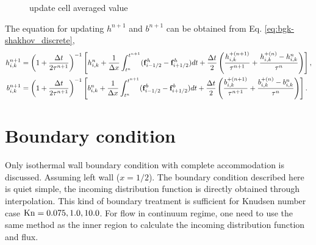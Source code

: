 \documentclass[a4paper]{book}
\begin{document}
\begin{figure}[htb!]
    \centering
    \caption{update cell averaged value}
    \label{pic:update}
\end{figure}

The equation for updating $h^{n+1}$ and $b^{n+1}$ can be obtained from Eq. \ref{eq:bgk-shakhov_discrete},
$$
\begin{aligned}
    h_{i,k}^{n+1} &= \left(1+\frac{\Delta t}{2\tau^{n+1}}\right)^{-1}\left[h_{i,k}^n+\frac{1}{\Delta x}\int_{t^n}^{t^{n+1}}({\bf f}_{i-1/2}^h-{\bf f}_{i+1/2}^h)dt+\frac{\Delta t}{2}\left(\frac{h_{i,k}^{+(n+1)}}{\tau^{n+1}}+\frac{h_{i,k}^{+(n)}-h_{i,k}^n}{\tau^n}\right)\right],\\
    b_{i,k}^{n+1} &= \left(1+\frac{\Delta t}{2\tau^{n+1}}\right)^{-1}\left[b_{i,k}^n+\frac{1}{\Delta x}\int_{t^n}^{t^{n+1}}({\bf f}_{i-1/2}^b-{\bf f}_{i+1/2}^b)dt+\frac{\Delta t}{2}\left(\frac{b_{i,k}^{+(n+1)}}{\tau^{n+1}}+\frac{b_{i,k}^{+(n)}-b_{i,k}^n}{\tau^n}\right)\right].\\
\end{aligned} 
$$

\section{Boundary condition}
Only isothermal wall boundary condition with complete accommodation is discussed. Assuming left wall ($x=1/2$). The boundary condition described here is quiet simple, the incoming distribution function is directly obtained through interpolation. This kind of boundary treatment is sufficient for Knudsen number case ${\rm Kn}=0.075, 1.0, 10.0$. For flow in continuum regime, one need to use the same method as the inner region to calculate the incoming distribution function and flux.
\end{document}
